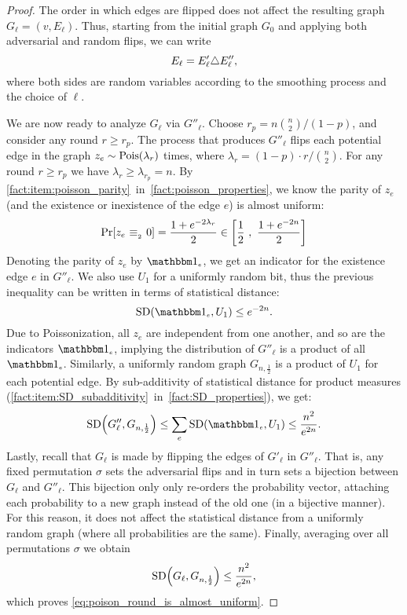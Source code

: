 \documentclass[letter,11pt]{article}
\begin{document}
\begin{proof}
    The order in which edges are flipped does not affect the resulting graph $G_{\ell} = (v,E_{\ell})$. Thus, starting from the initial graph $G_0$ and applying both adversarial and random flips, we can write
    \[
        E_{\ell} = E'_{\ell} \triangle E''_{\ell} ,
    \]
    where both sides are random variables according to the smoothing process and the choice of $\ell$.

    We are now ready to analyze $G_{\ell}$ via $G''_{\ell}$. Choose $r_p = n \binom{n}{2} / (1-p)$, and consider any round $r \geq r_p$.
    The process that produces $G''_{\ell}$ flips each potential edge in the graph $z_e \sim \poisson{\lambda_r}$ times, where $\lambda_r = (1-p)\cdot r / \binom{n}{2}$. For any round $r \geq r_p$ we have $\lambda_r \geq \lambda_{r_p} = n$. By \cref{fact:item:poisson_parity}~in~\cref{fact:poisson_properties}, we know the parity of $z_e$ (and the existence or inexistence of the edge $e$) is almost uniform:
    \[
        \Prob{}{z_e \sameparity 0}
        = \frac{1 + e^{-2\lambda_r}}{2} 
        \in \left[ \frac{1}{2}\ ,\  \frac{1 + e^{-2n}}{2}\right]
    \]
    Denoting the parity of $z_e$ by $\ind{e}$, we get an indicator for the existence edge $e$ in $G''_{\ell}$. 
    We also use $U_1$ for a uniformly random bit, thus the previous inequality can be written in terms of statistical distance:
    \[
        \sd{\ind{e}}{U_1} \leq e^{-2n} .
    \]
    Due to Poissonization, all $z_e$ are independent from one another, and so are the indicators $\ind{e}$, implying the distribution of $G''_{\ell}$ is a product of all $\ind{e}$. Similarly, a uniformly random graph $G_{n,\frac{1}{2}}$ is a product of $U_1$ for each potential edge.
    By sub-additivity of statistical distance for product measures (\cref{fact:item:SD_subadditivity}~in~\cref{fact:SD_properties}), we get:
    \[
        \sd{G''_{\ell}}{G_{n,\frac{1}{2}}}
        \leq \sum_{e}\sd{\ind{e}}{U_1}
        \leq \frac{n^2}{e^{2n}} .
    \]
    Lastly, recall that $G_{\ell}$ is made by flipping the edges of $G'_{\ell}$ in $G''_{\ell}$. That is, any fixed permutation $\sigma$ sets the adversarial flips and in turn sets a bijection between $G_{\ell}$ and $G''_{\ell}$. This bijection only only re-orders the probability vector, attaching each probability to a new graph instead of the old one (in a bijective manner). For this reason, it does not affect the statistical distance from a uniformly random graph (where all probabilities are the same). Finally, averaging over all permutations $\sigma$ we obtain  
    \[
        \sd{G_{\ell}}{G_{n,\frac{1}{2}}} \leq \frac{n^2}{e^{2n}} ,
    \]
    which proves \eqref{eq:poison_round_is_almost_uniform}.
    

\end{proof}
\end{document}
